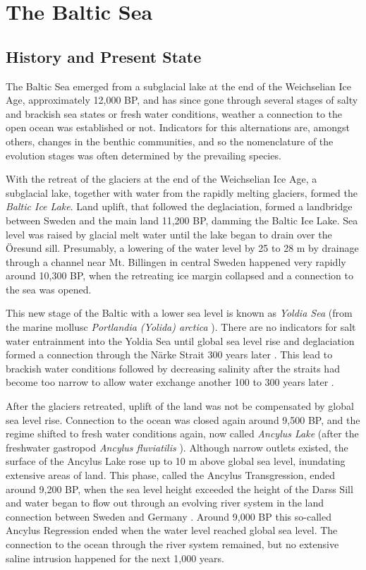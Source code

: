 \chapter{The Baltic Sea}
\label{kap-einleitung}

\section{History and Present State}

The Baltic Sea emerged from a subglacial lake at the end of the Weichselian Ice Age, approximately 12,000 BP, and has since gone through several stages of salty and brackish sea states or fresh water conditions, weather a connection to the open ocean was established or not. Indicators for this alternations are, amongst others, changes in the benthic communities, and so the nomenclature of the evolution stages was often determined by the prevailing species.

With the retreat of the glaciers at the end of the Weichselian Ice Age, a subglacial lake, together with water from the rapidly melting glaciers, formed the \textit{Baltic Ice Lake}. Land uplift, that followed the deglaciation, formed a landbridge between Sweden and the main land 11,200 BP, damming the Baltic Ice Lake. Sea level was raised by glacial melt water until the lake began to drain over the Öresund sill. Presumably, a lowering of the water level by 25 to 28 m by drainage through a channel near Mt. Billingen in central Sweden happened very rapidly around 10,300 BP, when the retreating ice margin collapsed \citep[][]{bjoerk95,tikkanen2002} and a connection to the sea was opened. 

This new stage of the Baltic with a lower sea level is known as \textit{Yoldia Sea} (from the marine mollusc \textit{Portlandia (Yolida) arctica} \citep[][]{schoning2001}). There are no indicators for salt water entrainment into the Yoldia Sea until global sea level rise and deglaciation formed a connection through the Närke Strait 300 years later \citep[][]{schoning2001}. This lead to brackish water conditions followed by decreasing salinity after the straits had become too narrow to allow water exchange another 100 to 300 years later \citep[][]{bjoerk95}.

After the glaciers retreated, uplift of the land was not be compensated by global sea level rise. Connection to the ocean was closed again around 9,500 BP, and the regime shifted to fresh water conditions again, now called \textit{Ancylus Lake} (after the freshwater gastropod \textit{Ancylus fluviatilis} \citep[][]{tikkanen2002}). Although narrow outlets existed, the surface of the Ancylus Lake rose up to 10 m above global sea level, inundating extensive areas of land. This phase, called the Ancylus Transgression, ended around 9,200 BP, when the sea level height exceeded the height of the Darss Sill and water began to flow out through an evolving river system in the land connection between Sweden and Germany \citep[][]{tikkanen2002}. Around 9,000 BP this so-called Ancylus Regression ended when the water level reached global sea level. The connection to the ocean through the river system remained, but no extensive saline intrusion happened for the next 1,000 years.

